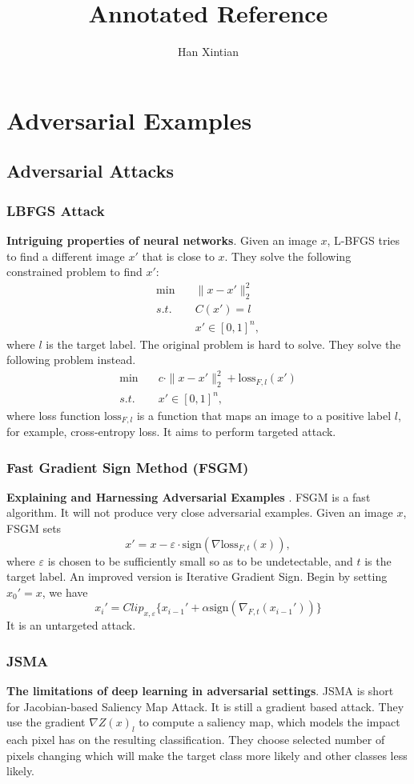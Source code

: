 \documentclass[10pt,a4paper]{article}
\title{Annotated Reference}
\author{Han Xintian}
\begin{document}
\maketitle
\section{Adversarial Examples}
\subsection{Adversarial Attacks}
\subsubsection{LBFGS Attack}
\textbf{Intriguing properties of neural networks}\cite{szegedy2013intriguing}. Given an image $x$, L-BFGS tries to find a different image $x'$ that is close to $x$. They solve the following constrained problem to find $x'$:
\begin{align*}
\min & \quad \|x-x'\|_2^2\\
s.t. & \quad C(x') = l\\
     & \quad x'\in [0,1]^n,	
\end{align*}
where $l$ is the target label. The original problem is hard to solve. They solve the following problem instead.
\begin{align*}
\min &\quad c\cdot \|x-x'\|_2^2+\text{loss}_{F,l}(x')\\
s.t. &\quad x' \in [0,1]^n,	
\end{align*}
where loss function $\text{loss}_{F,l}$ is a function that maps an image to a positive label $l$, for example, cross-entropy loss. It aims to perform targeted attack.
\subsubsection{Fast Gradient Sign Method (FSGM)}
\textbf{Explaining and Harnessing Adversarial Examples} \cite{goodfellow2014explaining}.
FSGM is a fast algorithm. It will not produce very close adversarial examples. Given an image $x$, FSGM sets
\[
x' = x- \varepsilon \cdot \text{sign}(\nabla \text{loss}_{F,t}(x)),
\]
where $\varepsilon$ is chosen to be sufficiently small so as to be undetectable, and $t$ is the target label. An improved version is Iterative Gradient Sign. Begin by setting $x_0' = x$, we have 
\[
x_i' = Clip_{x,\varepsilon}\{x_{i-1}'+\alpha \text{sign}(\nabla_{F,t}(x_{i-1}')) \}
\]
It is an untargeted attack.
\subsubsection{JSMA}
\textbf{The limitations of deep learning in adversarial settings}\cite{papernot2016limitations}.
JSMA is short for Jacobian-based Saliency Map Attack. It is still a gradient based attack. They use the gradient $\nabla Z(x)_l$ to compute a saliency map, which models the impact each pixel has on the resulting classification. They choose selected number of pixels changing which will make the target class more likely and other classes less likely.
\end{document}
